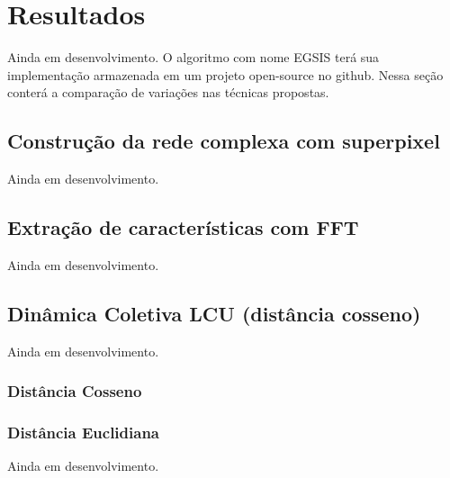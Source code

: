 \chapter{Resultados}\label{chap:resultados}

Ainda em desenvolvimento. O algoritmo com nome EGSIS terá sua
implementação armazenada em um projeto open-source no github. Nessa
seção conterá a comparação de variações nas técnicas propostas.


\section{Construção da rede complexa com superpixel}\label{sec:resultados-rede-complexa-superpixel}

Ainda em desenvolvimento.


\section{Extração de características com FFT}\label{sec:resultados-extracao-de-caracteristicas--fft}

Ainda em desenvolvimento.


\section{Dinâmica Coletiva LCU (distância cosseno)}\label{sec:resultados-dinamica-coletiva-lcu-cos}

Ainda em desenvolvimento.

\subsection{Distância Cosseno}\label{sec:resultados-distancia-cosseno}

\subsection{Distância Euclidiana}\label{sec:resultados-distancia-cosseno}

Ainda em desenvolvimento.
